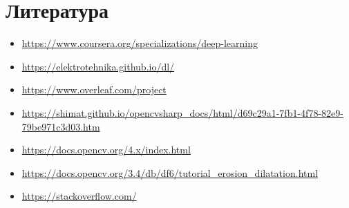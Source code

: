 \documentclass[12pt]{article}
\begin{document}
\newpage
\section{Литература}
\begin{itemize}
  \item \url{https://www.coursera.org/specializations/deep-learning}
  \item \url{https://elektrotehnika.github.io/dl/}
  \item \url{https://www.overleaf.com/project}
  \item \url{https://shimat.github.io/opencvsharp_docs/html/d69c29a1-7fb1-4f78-82e9-79be971c3d03.htm}
  \item \url{https://docs.opencv.org/4.x/index.html}
  \item \url{https://docs.opencv.org/3.4/db/df6/tutorial_erosion_dilatation.html}
  \item \url{https://stackoverflow.com/}
\end{itemize}
\end{document}
